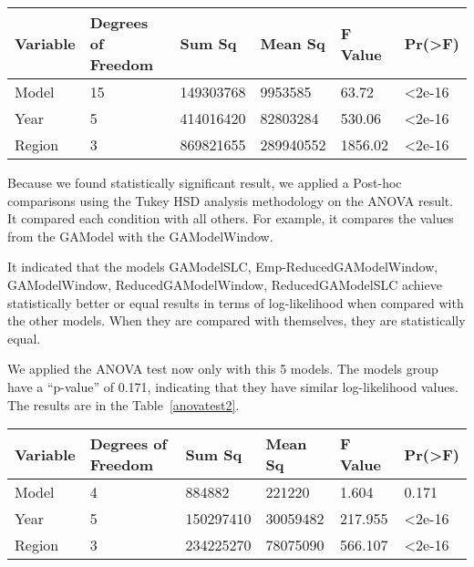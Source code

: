 \begin{table*}[]
	\centering
	\begin{tabular}{|l|l|l|l|l|l|}
		\hline
		{Variable} & {Degrees of Freedom} & {Sum Sq}    & {Mean Sq}   & {F Value} & {Pr(\textgreater F)} \\
		\hline
		Model    & 15           	  & 149303768  & 9953585   & 63.72    & \textless2e-16     \\
		\hline
		Year     & 5                  & 414016420  & 82803284  & 530.06   & \textless2e-16     \\
		\hline
		Region   & 3                  & 869821655  & 289940552  & 1856.02   & \textless2e-16	\\    
		\hline
	\end{tabular}
	\caption{ANOVA Test Results Values - Mainshock Models Mainshock and Aftershock Models.}
	\label{anovatest1}
\end{table*}

Because we found statistically significant result, we applied a Post-hoc comparisons using the Tukey HSD analysis methodology on the ANOVA result. It compared each condition with all others. For example, it compares the values from the GAModel with the GAModelWindow. 

It indicated that the models GAModelSLC, Emp-ReducedGAModelWindow, GAModelWindow, ReducedGAModelWindow, ReducedGAModelSLC achieve statistically better or equal results in terms of log-likelihood when compared with the other models. When they are compared with themselves, they are statistically equal. 

We applied the ANOVA test now only with this 5 models. The models group have a ``p-value'' of 0.171, indicating that they have similar log-likelihood values. The results are in the Table~\ref{anovatest2}.
     
\begin{table*}[]
	\centering
	\begin{tabular}{|l|l|l|l|l|l|}
		\hline
		{Variable} & {Degrees of Freedom} & {Sum Sq}    & {Mean Sq}   & {F Value} & {Pr(\textgreater F)} \\
		\hline
		Model    & 4           	  & 884882  & 221220   & 1.604    & 0.171    \\
		\hline
		Year     & 5                 & 150297410  & 30059482  & 217.955   & \textless2e-16     \\
		\hline
		Region   & 3                  & 234225270  & 78075090  & 566.107   & \textless2e-16	\\    
		\hline
	\end{tabular}
	\caption{ANOVA Test Results Values - Emp-ReducedGAModelWindow, GAModelWindow, ReducedGAModelWindow, GAModelSLC, ReducedGAModelSLC.}
	\label{anovatest2}
\end{table*}

